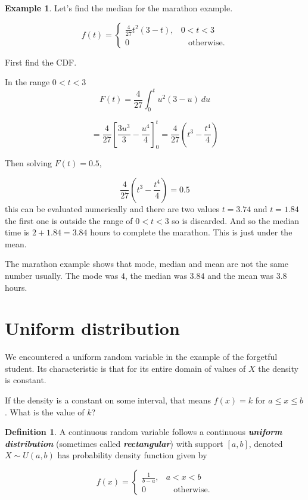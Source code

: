 \documentclass[
]{book}
\theoremstyle{definition}
\newtheorem{definition}{Definition}[chapter]
\theoremstyle{definition}
\newtheorem{example}{Example}[chapter]
\theoremstyle{definition}
\theoremstyle{definition}
\theoremstyle{remark}
\begin{document}
\begin{example}
Let's find the median for the marathon example.

\begin{equation*}
  f(t)=\begin{cases}
    \frac{4}{27}t^2(3-t), &  0< t < 3\\
    0 & \ \ \ \  \text{otherwise}.
  \end{cases}
\end{equation*}

First find the CDF.

In the range \(0< t < 3\)
\[F(t) = \frac{4}{27}\int_{0}^{t} u^2(3-u) \ du\]

\[= \frac{4}{27}\left[\frac{3u^3}{3}-\frac{u^4}{4}\right]^{t}_{0} =\frac{4}{27}\left( t^3 - \frac{t^4}{4} \right)\]

Then solving \(F(t)=0.5\),

\[\frac{4}{27}\left(t^3 - \frac{t^4}{4} \right)= 0.5\]
this can be evaluated numerically and there are two values \(t=3.74\) and \(t= 1.84\) the first one is outside the range of \(0< t < 3\) so is discarded. And so the median time is \(2+1.84 = 3.84\) hours to complete the marathon. This is just under the mean.
\end{example}

The marathon example shows that mode, median and mean are not the same number usually. The mode was \(4\), the median was \(3.84\) and the mean was \(3.8\) hours.

\hypertarget{uniform-distribution}{%
\section{Uniform distribution}\label{uniform-distribution}}

We encountered a uniform random variable in the example of the forgetful student. Its characteristic is that for its entire domain of values of \(X\) the density is constant.

If the density is a constant on some interval, that means \(f(x) = k\) for \(a\leq x \leq b\). What is the value of \(k\)?

\begin{definition}
A continuous random variable follows a continuous \textbf{\emph{uniform distribution}} (sometimes called \textbf{\emph{rectangular}}) with support \([a,b]\), denoted \(X\sim U(a,b)\) has probability density function given by

\begin{equation*}
  f(x)=\begin{cases}
    \frac{1}{b-a}, &  a< x < b\\
    0 & \ \ \ \  \text{otherwise}.
  \end{cases}
\end{equation*}
\end{definition}
\end{document}
